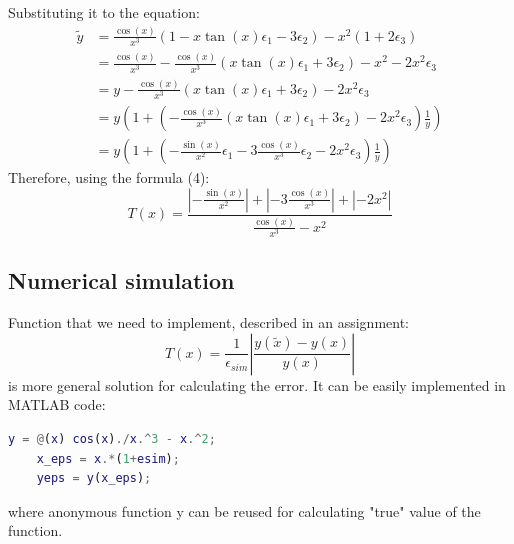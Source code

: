 Substituting it to the equation:
\begin{align*}
\tilde{y}&=\frac{\cos(x)}{x^3}(1 - x\tan(x) \epsilon_1 - 3\epsilon_2)-x^2(1+2\epsilon_3)\\
    &=\frac{\cos(x)}{x^3}-\frac{\cos(x)}{x^3}(x\tan(x) \epsilon_1 +
    3\epsilon_2)-x^2-2x^2\epsilon_3 \\
    &=y-\frac{\cos(x)}{x^3}(x\tan(x) \epsilon_1 + 3\epsilon_2)-2x^2\epsilon_3\\
    &=y(1 + (-\frac{\cos(x)}{x^3}(x\tan(x) \epsilon_1 +
    3\epsilon_2)-2x^2\epsilon_3)\frac1y)\\
    &=y\left(1 + \left(-\frac{\sin(x)}{x^2}\epsilon_1
    -3\frac{\cos(x)}{x^3}\epsilon_2 - 2x^2\epsilon_3\right)\frac1y\right)
\end{align*}
Therefore, using the formula (4):
$$T(x) = \displaystyle\frac{ \left|-\frac{\sin(x)}{x^2}\right| +
\left|- 3\frac{\cos(x)}{x^3}\right| + \left|-2x^2\right| }
{\frac{\cos(x)}{x^3} - x^2}$$

\subsection{Numerical simulation}
Function that we need to implement, described in an assignment:
$$T(x) = \frac{1}{\epsilon_{sim}}\left| \displaystyle\frac{y(\tilde{x}) - y(x)}{y(x)} \right|$$
is more general solution for calculating the error. It can be easily implemented 
in MATLAB code:
\begin{lstlisting}[language=MATLAB]
    y = @(x) cos(x)./x.^3 - x.^2;
    x_eps = x.*(1+esim);
    yeps = y(x_eps);
\end{lstlisting}
where anonymous function y can be reused for calculating "true" value of the function.

